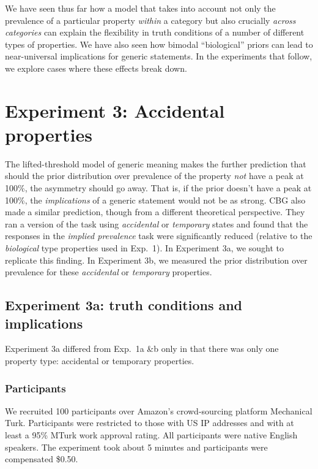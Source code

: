 \documentclass[10pt,letterpaper]{article}
\begin{document}
We have seen thus far how a model that takes into account not only the prevalence of a particular property \emph{within} a category but also crucially \emph{across categories} can explain the flexibility in truth conditions of a number of different types of properties. We have also seen how bimodal ``biological'' priors can lead to near-universal implications for generic statements. In the experiments that follow, we explore cases where these effects break down.


\section{Experiment 3: Accidental properties}

The lifted-threshold model of generic meaning makes the further prediction that should the prior distribution over prevalence of the property \emph{not} have a peak at 100\%, the asymmetry should go away. That is, if the prior doesn't have a peak at 100\%, the \emph{implications} of a generic statement would not be as strong. CBG also made a similar prediction, though from a different theoretical perspective. They ran a version of the task using \emph{accidental} or \emph{temporary} states and found that the responses in the \emph{implied prevalence} task were significantly reduced (relative to the \emph{biological} type properties used in Exp.~1). In Experiment 3a, we sought to replicate this finding. In Experiment 3b, we measured the prior distribution over prevalence for these \emph{accidental} or \emph{temporary} properties.

\subsection{Experiment 3a: truth conditions and implications}

Experiment 3a differed from Exp.~1a \&b only in that there was only one property type: accidental or temporary properties. 

\subsubsection{Participants}

We recruited 100 participants over Amazon's crowd-sourcing platform Mechanical Turk. Participants were restricted to those with US IP addresses and with at least a 95\% MTurk work approval rating. All participants were native English speakers. The experiment took about 5 minutes and participants were compensated \$0.50.
\end{document}
